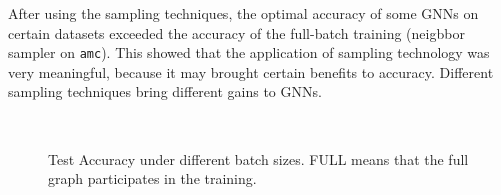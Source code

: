 %
After using the sampling techniques, the optimal accuracy of some GNNs on certain datasets exceeded the accuracy of the full-batch training (neigbbor sampler on \texttt{amc}).
%
This showed that the application of sampling technology was very meaningful, because it may brought certain benefits to accuracy.
%
Different sampling techniques bring different gains to GNNs.
%
\begin{figure}[H]
    \centering
     \\
    \caption{Test Accuracy under different batch sizes. FULL means that the full graph participates in the training.}
    \label{fig:exp_sampling_relative_batch_size_accuracy}
\end{figure}

